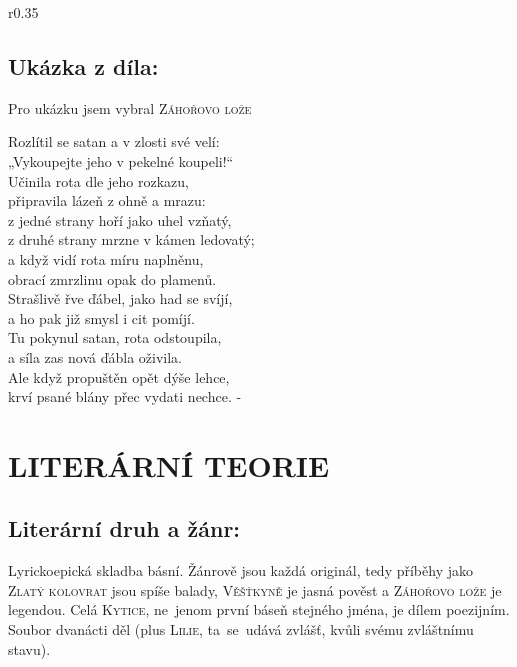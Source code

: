 \documentclass[A4paper]{extarticle} %
\begin{document}
\noindent\begin{wrapfigure}{r}{0.35\textwidth}
\tiny

\subsection*{Ukázka z díla:}
\setlength{\parindent}{3pt}
Pro ukázku jsem vybral \textsc{Záhořovo lože}
\begin{center}
\noindent
Rozlítil se satan a v zlosti své velí: \\
„Vykoupejte jeho v pekelné koupeli!“ \\
Učinila rota dle jeho rozkazu, \\
připravila lázeň z ohně a mrazu: \\
z jedné strany hoří jako uhel vzňatý, \\
z druhé strany mrzne v kámen ledovatý; \\
a když vidí rota míru naplněnu, \\
obrací zmrzlinu opak do plamenů. \\
Strašlivě řve ďábel, jako had se svíjí, \\
a ho pak již smysl i cit pomíjí. \\
Tu pokynul satan, rota odstoupila, \\
a síla zas nová ďábla oživila. \\
Ale když propuštěn opět dýše lehce, \\
krví psané blány přec vydati nechce. -
\end{center}
\vspace{3em}
\end{wrapfigure}

\section*{LITERÁRNÍ TEORIE}

\subsection*{Literární druh a žánr:}
\noindent 
Lyrickoepická skladba básní.
Žánrově jsou každá originál,
tedy příběhy jako \textsc{Zlatý kolovrat} jsou spíše balady,
\textsc{Věšťkyně} je jasná pověst
a \textsc{Záhořovo lože} je legendou.
Celá \textsc{Kytice}, ne~jenom první báseň stejného jména, je dílem poezijním.
Soubor dvanácti děl (plus \textsc{Lilie}, ta~se~udává zvlášť, kvůli svému zvláštnímu stavu).

\end{document}
